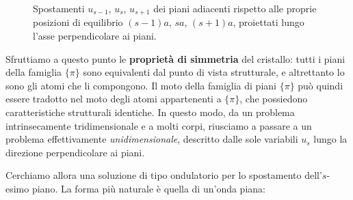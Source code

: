 \begin{figure}[htbp]
    \centering
    \caption{Spostamenti \( u_{s-1} \), \( u_s \), \( u_{s+1} \) dei piani adiacenti rispetto alle proprie posizioni di equilibrio \( (s-1)a \), \( sa \), \( (s+1)a \), proiettati lungo l'asse perpendicolare ai piani.}
    \label{fig:spostamenti_piani}
\end{figure}

Sfruttiamo a questo punto le \textbf{proprietà di simmetria} del cristallo: tutti i piani della famiglia \( \{\pi\} \) sono equivalenti dal punto di vista strutturale, e altrettanto lo sono gli atomi che li compongono. Il moto della famiglia di piani \( \{\pi\} \) può quindi essere tradotto nel moto degli atomi appartenenti a \( \{\pi\} \), che possiedono caratteristiche strutturali identiche. In questo modo, da un problema intrinsecamente tridimensionale e a molti corpi, riusciamo a passare a un problema effettivamente \emph{unidimensionale}, descritto dalle sole variabili \( u_s \) lungo la direzione perpendicolare ai piani.

Cerchiamo allora una soluzione di tipo ondulatorio per lo spostamento dell'\( s \)-esimo piano. La forma più naturale è quella di un'onda piana:

